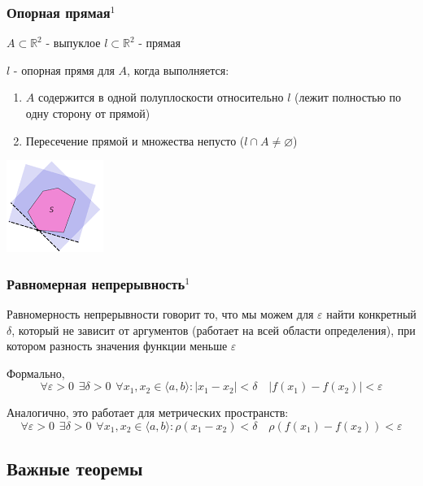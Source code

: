 \documentclass{article}
\begin{document}
\subsubsection{Опорная прямая\texorpdfstring{$^1$}{}}
$A \subset \mathbb{R}^2$ - выпуклое
$l \subset \mathbb{R}^2$ - прямая

$l$ - опорная прямя для $A$, когда выполняется:
\begin{enumerate}
    \item $A$ содержится в одной полуплоскости относительно $l$ (лежит полностью по одну сторону от прямой)
    \item Пересечение прямой и множества непусто ($l \cap A \ne \varnothing$)
\end{enumerate}
\includegraphics{baseline}


\subsubsection{Равномерная непрерывность\texorpdfstring{$^1$}{}}
Равномерность непрерывности говорит то, что мы можем для $\varepsilon$ найти конкретный $\delta$, который не зависит от аргументов (работает на всей области определения), при котором разность значения функции меньше $\varepsilon$

Формально, 
$$
\forall \varepsilon > 0 \hspace{5pt} \exists \delta > 0 \hspace{5pt} \forall x_1, x_2 \in \langle a, b \rangle : |x_1 - x_2| < \delta \quad |f(x_1) - f(x_2)| < \varepsilon 
$$

Аналогично, это работает для метрических пространств:
$$
\forall \varepsilon > 0 \hspace{5pt} \exists \delta > 0 \hspace{5pt} \forall x_1, x_2 \in \langle a, b \rangle : \rho(x_1 - x_2) < \delta \quad \rho(f(x_1) - f(x_2)) < \varepsilon 
$$



\newpage
\subsection{Важные теоремы}
\end{document}
